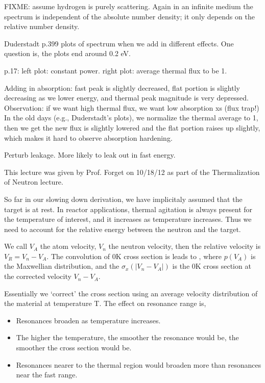 \documentclass{school-22.211-notes}
\begin{document}
FIXME: assume hydrogen is purely scattering. Again in an infinite medium the spectrum is independent of the absolute number density; it only depends on the relative number density. 


Duderstadt p.399 plots of spectrum when we add in different effects. One question is, the plots end around 0.2 eV. 

p.17: left plot: constant power. right plot: average thermal flux to be 1. 

Adding in absorption: fast peak is slightly decreased, flat portion is slightly decreasing as we lower energy, and thermal peak magnitude is very depressed. Observation: if we want high thermal flux, we want low absorption xs (flux trap!) 
In the old days (e.g., Duderstadt's plots), we normalize the thermal average to 1, then we get the new flux is slightly lowered and the flat portion raises up slightly, which makes it hard to observe absorption hardening. 

Perturb leakage. More likely to leak out in fast energy. 


\clearpage
{} %
This lecture was given by Prof. Forget on 10/18/12 as part of the Thermalization of Neutron lecture. 
 
So far in our slowing down derivation, we have implicitaly assumed that the target is at rest. In reactor applications, thermal agitation is always present for the temperature of interest, and it increases as temperature increases. Thus we need to account for the relative energy between the neutron and the target. 

We call $V_A$ the atom velocity, $V_n$ the neutron velocity, then the relative velocity is $V_R = V_n - V_A$. The convolution of 0K cross section is leads to , 
where $p(V_A)$ is the Maxwellian distribution, and the $\sigma_x(|V_n - V_A|)$ is the 0K cross section at the corrected velocity $V_n - V_A$. 

Essentially we `correct' the cross section using an average velocity distribution of the material at temperature T. The effect on resonance range is, 
\begin{itemize}
\item Resonances broaden as temperature increases. 
\item The higher the temperature, the smoother the resonance would be, the smoother the cross section would be. 
\item Resonances nearer to the thermal region would broaden more than resonances near the fast range. 
\end{itemize}
\end{document}
